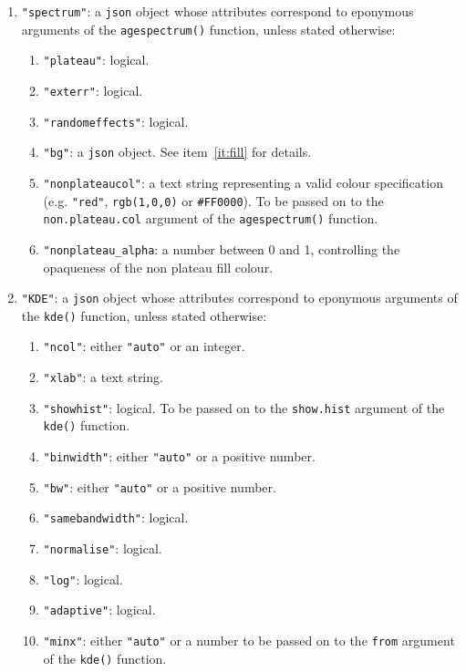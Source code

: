\begin{refsection}
\begin{enumerate}[leftmargin=\parindent,align=left,
      labelwidth=\parindent,label*=2.\arabic*.]
\item{\tt "spectrum"}: a \texttt{json} object whose attributes
  correspond to eponymous arguments of the \texttt{agespectrum()}
  function, unless stated otherwise:
  \begin{enumerate}[leftmargin=\parindent,align=left,
      labelwidth=\parindent,label*=\arabic*.]
  \item{\tt "plateau"}: logical.
    \item{\tt "exterr"}: logical.
    \item{\tt "randomeffects"}: logical.
    \item{\tt "bg"}: a \texttt{json} object. See item~\ref{it:fill}
      for details.
    \item{\tt "nonplateaucol"}: a text string representing a valid
      colour specification (e.g. \texttt{"red"}, \texttt{rgb(1,0,0)}
      or \texttt{\#FF0000}). To be passed on to the
      \texttt{non.plateau.col} argument of the \texttt{agespectrum()}
      function.
    \item{ \verb|"nonplateau_alpha|}: a number between 0 and 1,
      controlling the opaqueness of the non plateau fill colour.
  \end{enumerate}  
\item{\tt "KDE"}: a \texttt{json} object whose attributes correspond
  to eponymous arguments of the \texttt{kde()} function, unless stated
  otherwise:
  \begin{enumerate}[leftmargin=\parindent,align=left,
      labelwidth=\parindent,label*=\arabic*.]
    \item{\tt "ncol"}: either \texttt{"auto"} or an integer.
    \item{\tt "xlab"}: a text string.
    \item{\tt "showhist"}: logical. To be passed on to the
      \texttt{show.hist} argument of the \texttt{kde()} function.
    \item{\tt "binwidth"}: either \texttt{"auto"} or a positive
      number.
    \item{\tt "bw"}: either \texttt{"auto"} or a positive number.
    \item{\tt "samebandwidth"}: logical.
    \item{\tt "normalise"}: logical.
    \item{\tt "log"}: logical.
    \item{\tt "adaptive"}: logical.
    \item{\tt "minx"}: either \texttt{"auto"} or a number to be passed
      on to the \texttt{from} argument of the \texttt{kde()} function.

\end{enumerate}
\end{enumerate}
\end{refsection}
